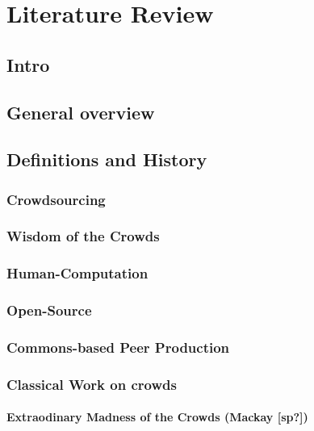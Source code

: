 \chapter{Literature Review}\label{literature-review}

\section{Intro}\label{intro}

\section{General overview}\label{general-overview}

\section{Definitions and History}\label{definitions-and-history}

\subsection{Crowdsourcing}\label{crowdsourcing}

\subsection{Wisdom of the Crowds}\label{wisdom-of-the-crowds}

\subsection{Human-Computation}\label{human-computation}

\subsection{Open-Source}\label{open-source}

\subsection{Commons-based Peer
Production}\label{commons-based-peer-production}

\subsection{Classical Work on crowds}\label{classical-work-on-crowds}

\subsubsection{Extraodinary Madness of the Crowds (Mackay
{[}sp?{]})}\label{extraodinary-madness-of-the-crowds-mackay-sp}


